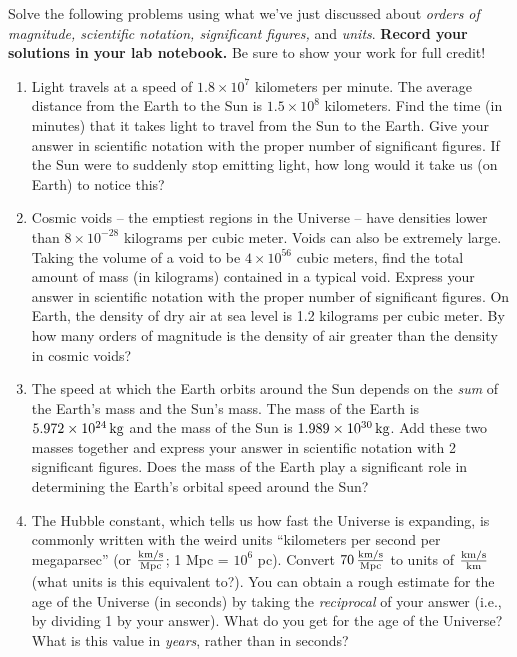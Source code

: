 \documentclass[11pt]{article}
\begin{document}
Solve the following problems using what we've just discussed about \textit{orders of magnitude, scientific notation, significant figures,} and \textit{units}.  \textbf{Record your solutions in your lab notebook.}  Be sure to show your work for full credit!
\begin{enumerate}
    \item Light travels at a speed of $1.8 \times 10^7$ kilometers per minute. The average distance from the Earth to the Sun is $1.5 \times 10^8$ kilometers. Find the time (in minutes) that it takes light to travel from the Sun to the Earth. Give your answer in scientific notation with the proper number of significant figures. If the Sun were to suddenly stop emitting light, how long would it take us (on Earth) to notice this? 
    
    \item Cosmic voids -- the emptiest regions in the Universe -- have densities lower than $8 \times 10^{-28}$ kilograms per cubic meter. Voids can also be extremely large. Taking the volume of a void to be $4 \times 10^{56}$ cubic meters, find the total amount of mass (in kilograms) contained in a typical void. Express your answer in scientific notation with the proper number of significant figures. On Earth, the density of dry air at sea level is 1.2 kilograms per cubic meter. By how many orders of magnitude is the density of air greater than the density in cosmic voids?
    
    \item The speed at which the Earth orbits around the Sun depends on the \emph{sum} of the Earth's mass and the Sun's mass. The mass of the Earth is $5.972 \times 10^{24} \, {\rm kg}$ and the mass of the Sun is $1.989 \times 10^{30} \, {\rm kg}$. Add these two masses together and express your answer in scientific notation with 2 significant figures. Does the mass of the Earth play a significant role in determining the Earth's orbital speed around the Sun?

    \item The Hubble constant, which tells us how fast the Universe is expanding, is commonly written with the weird units ``kilometers per second per megaparsec'' (or $\frac{\rm km/s}{\rm Mpc}$; 1 Mpc = $10^6$ pc). Convert $70 \, \frac{\rm km/s}{\rm Mpc}$ to units of $\frac{\rm km/s}{\rm km}$ (what units is this equivalent to?). You can obtain a rough estimate for the age of the Universe (in seconds) by taking the \emph{reciprocal} of your answer (i.e., by dividing 1 by your answer). What do you get for the age of the Universe? What is this value in \emph{years}, rather than in seconds? 
\end{enumerate}
\end{document}
